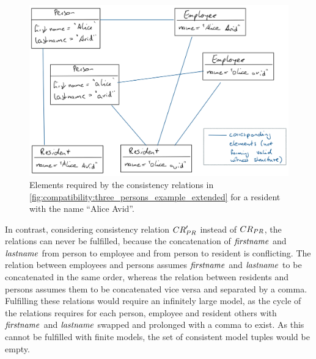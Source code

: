 \begin{figure}
    \centering
    \includegraphics[width=\textwidth]{figures/correctness/compatibility/intuitive_incompatibility.png}
    \caption[Example for an intuitive notion of incompatibility]{Elements required by the consistency relations in \autoref{fig:compatibility:three_persons_example_extended} for a resident with the name \enquote{Alice Avid}.}
    \label{fig:compatibility:intuitive_incompatibility}
\end{figure}

In contrast, considering consistency relation $\consistencyrelation{CR}{PR}'$ instead of $\consistencyrelation{CR}{PR}$, the relations can never be fulfilled, because the concatenation of $\mathit{firstname}$ and $\mathit{lastname}$ from person to employee and from person to resident is conflicting.
The relation between employees and persons assumes $\mathit{firstname}$ and $\mathit{lastname}$ to be concatenated in the same order, whereas the relation between residents and persons assumes them to be concatenated vice versa and separated by a comma.
Fulfilling these relations would require an infinitely large model, as the cycle of the relations requires for each person, employee and resident others with $\mathit{firstname}$ and $\mathit{lastname}$ swapped and prolonged with a comma to exist.
As this cannot be fulfilled with finite models, the set of consistent model tuples would be empty.

